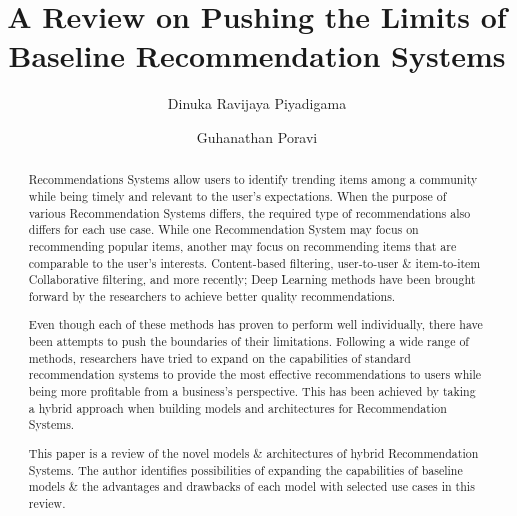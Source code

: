\documentclass[manuscript,screen,review]{acmart}
\begin{document}
\title{A Review on Pushing the Limits of Baseline Recommendation Systems}

\author{Dinuka Ravijaya Piyadigama}

\author{Guhanathan Poravi}


\begin{abstract}
 Recommendations Systems allow users to identify trending items among a community while being timely and relevant to the user's expectations. When the purpose of various Recommendation Systems differs, the required type of recommendations also differs for each use case. While one Recommendation System may focus on recommending popular items, another may focus on recommending items that are comparable to the user's interests. Content-based filtering, user-to-user \& item-to-item Collaborative filtering, and more recently; Deep Learning methods have been brought forward by the researchers to achieve better quality recommendations. 

Even though each of these methods has proven to perform well individually, there have been attempts to push the boundaries of their limitations. Following a wide range of methods, researchers have tried to expand on the capabilities of standard recommendation systems to provide the most effective recommendations to users while being more profitable from a business's perspective. This has been achieved by taking a hybrid approach when building models and architectures for Recommendation Systems.

This paper is a review of the novel models \& architectures of hybrid Recommendation Systems. The author identifies possibilities of expanding the capabilities of baseline models \& the advantages and drawbacks of each model with selected use cases in this review.
\end{abstract}
\end{document}
